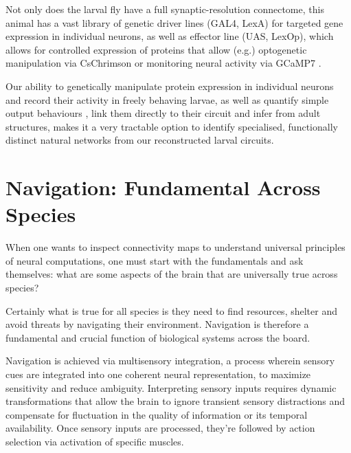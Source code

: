 Not only does the larval fly have a full synaptic-resolution connectome, this animal has a vast library of genetic driver lines (GAL4, LexA) for targeted gene expression in individual neurons, as well as effector line (UAS, LexOp), which allows for controlled expression of proteins that allow (e.g.) optogenetic manipulation via CsChrimson \citep{kim2015optogenetics} or monitoring neural activity via GCaMP7 \citep{owald2015light}. 

Our ability to genetically manipulate protein expression in individual neurons and record their activity in freely behaving larvae, as well as quantify simple output behaviours \citep{vogelstein2014discovery}, link them directly to their circuit and infer from adult structures, makes it a very tractable option to identify specialised, functionally distinct natural networks from our reconstructed larval circuits. %





\label{}

\section{Navigation: Fundamental Across Species} 
    When one wants to inspect connectivity maps to understand universal principles of neural computations, one must start with the fundamentals and ask themselves: what are some aspects of the brain that are universally true across species? 

    Certainly what is true for all species is they need to find resources, shelter and avoid threats by navigating their environment. Navigation is therefore a fundamental and crucial function of biological systems across the board. 

    Navigation is achieved via multisensory integration, a process wherein sensory cues are integrated into one coherent neural representation, to maximize sensitivity and reduce ambiguity. Interpreting sensory inputs requires dynamic transformations that allow the brain to ignore transient sensory distractions and compensate for fluctuation in the quality of information or its temporal availability. Once sensory inputs are processed, they're followed by action selection via activation of specific muscles. 
    
